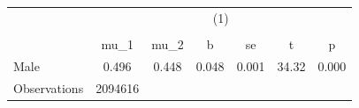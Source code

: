 {
\def\sym#1{\ifmmode^{#1}\else\(^{#1}\)\fi}
\begin{tabular}{l*{1}{cccccc}}
\hline\hline
                    &\multicolumn{6}{c}{(1)}                                                      \\
                    &\multicolumn{6}{c}{}                                                         \\
                    &        mu\_1&        mu\_2&           b&          se&           t&           p\\
\hline
Male                &       0.496&       0.448&       0.048&       0.001&       34.32&       0.000\\
\hline
Observations        &     2094616&            &            &            &            &            \\
\hline\hline
\end{tabular}
}
